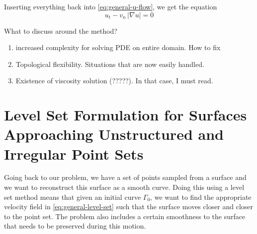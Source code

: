 Inserting everything back into \eqref{eq:general-u-flow}, we get the equation
\begin{equation}
    u_t - v_n\, |\nabla u| = 0
    \label{eq:general-level-set}
\end{equation}

What to discuss around the method?
\begin{enumerate}
    \item increased complexity for solving PDE on entire domain. How to fix
    \item Topological flexibility. Situations that are now easily handled.
    \item Existence of viscosity solution (?????). In that case, I must read.
\end{enumerate}

\newpage
\section{Level Set Formulation for Surfaces Approaching Unstructured and Irregular Point Sets}
Going back to our problem, we have a set of points sampled from a surface and we want to
reconstruct this surface as a smooth curve. Doing this using
a level set method means that given an initial curve $\Gamma_0$, we want to find the 
appropriate velocity field in \eqref{eq:general-level-set} such that the surface moves
closer and closer to the point set. The problem also includes a certain smoothness to 
the surface that needs to be preserved during this motion.



